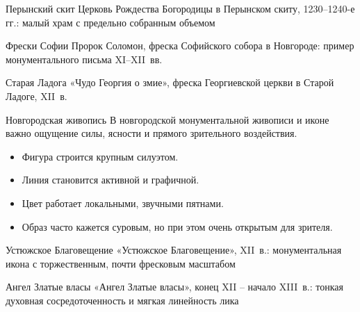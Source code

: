 \begin{frame}{Перынский скит}
    {Церковь Рождества Богородицы в Перынском скиту,
     1230--1240-е гг.: малый храм с предельно собранным объемом}
\end{frame}

\begin{frame}{Фрески Софии}
    {Пророк Соломон, фреска Софийского собора в Новгороде:
     пример монументального письма XI--XII~вв.}
\end{frame}

\begin{frame}{Старая Ладога}
    {«Чудо Георгия о змие», фреска Георгиевской церкви
     в Старой Ладоге, XII~в.}
\end{frame}

\begin{frame}{Новгородская живопись}
  В новгородской монументальной живописи и иконе важно
  ощущение силы, ясности и прямого зрительного воздействия.

  \begin{itemize}
    \item Фигура строится крупным силуэтом.
    \item Линия становится активной и графичной.
    \item Цвет работает локальными, звучными пятнами.
    \item Образ часто кажется суровым, но при этом очень открытым
          для зрителя.
  \end{itemize}
\end{frame}

\begin{frame}{Устюжское Благовещение}
    {«Устюжское Благовещение», XII~в.:
     монументальная икона с торжественным, почти фресковым масштабом}
\end{frame}

\begin{frame}{Ангел Златые власы}
    {«Ангел Златые власы», конец XII -- начало XIII~в.:
     тонкая духовная сосредоточенность и мягкая линейность лика}
\end{frame}


